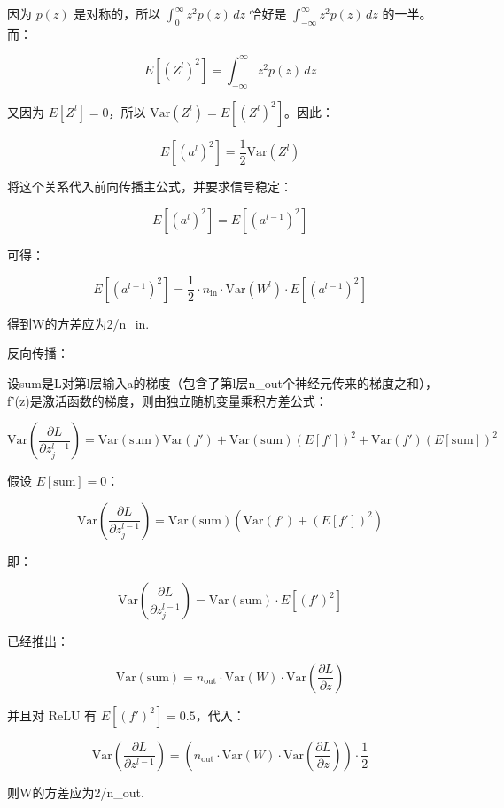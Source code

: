 因为 \(p(z)\) 是对称的，所以 \(\int_0^\infty z^2p(z)\,dz\) 恰好是 \(\int_{-\infty}^{\infty}z^2p(z)\,dz\) 的一半。而：

\[
E[(Z^l)^2]=\int_{-\infty}^{\infty}z^2p(z)\,dz
\]

又因为 \(E[Z^l]=0\)，所以 \(\mathrm{Var}(Z^l)=E[(Z^l)^2]\)。因此：

\[
E[(a^l)^2]=\frac{1}{2}\mathrm{Var}(Z^l)
\]

将这个关系代入前向传播主公式，并要求信号稳定：

\[
E[(a^l)^2]=E[(a^{l-1})^2]
\]

可得：

\[
E[(a^{l-1})^2]
=\frac{1}{2}\cdot n_{\mathrm{in}}\cdot \mathrm{Var}(W^l)\cdot E[(a^{l-1})^2]
\]

得到W的方差应为2/n\_in.

反向传播：

设sum是L对第l层输入a的梯度（包含了第l层n\_out个神经元传来的梯度之和），f'(z)是激活函数的梯度，则由独立随机变量乘积方差公式：

\[
\mathrm{Var}\left(\frac{\partial L}{\partial z_j^{l-1}}\right)
=\mathrm{Var}(\mathrm{sum})\mathrm{Var}(f')
+\mathrm{Var}(\mathrm{sum})(E[f'])^2
+\mathrm{Var}(f')(E[\mathrm{sum}])^2
\]

假设 \(E[\mathrm{sum}]=0\)：

\[
\mathrm{Var}\left(\frac{\partial L}{\partial z_j^{l-1}}\right)
=\mathrm{Var}(\mathrm{sum})\left(\mathrm{Var}(f')+(E[f'])^2\right)
\]

即：

\[
\mathrm{Var}\left(\frac{\partial L}{\partial z_j^{l-1}}\right)
=\mathrm{Var}(\mathrm{sum})\cdot E[(f')^2]
\]

已经推出：

\[
\mathrm{Var}(\mathrm{sum})
=n_{\mathrm{out}}\cdot\mathrm{Var}(W)\cdot
\mathrm{Var}\left(\frac{\partial L}{\partial z}\right)
\]

并且对 ReLU 有 \(E[(f')^2]=0.5\)，代入：

\[
\mathrm{Var}\left(\frac{\partial L}{\partial z^{l-1}}\right)
=\left(n_{\mathrm{out}}\cdot\mathrm{Var}(W)\cdot
\mathrm{Var}\left(\frac{\partial L}{\partial z}\right)\right)\cdot\frac{1}{2}
\]

则W的方差应为2/n\_out.

